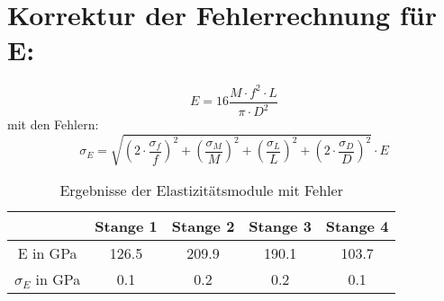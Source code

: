 \documentclass[12pt,a4paper]{article}
\author{Gruppe C14 \\ Julián Häck, Martin Koytek, Lars Wenning, Erik Zimmermann}
\begin{document}
\section{Korrektur der Fehlerrechnung für E:}
\begin{equation}
E=16 \frac{M\cdot f^2\cdot L}{\pi\cdot D^2}
\end{equation}
mit den Fehlern:
\begin{equation}
\sigma_{E}=\sqrt{(2\cdot\frac{\sigma_{f}}{f})^2+(\frac{\sigma_M}{M})^2+(\frac{\sigma_L}{L})^2+(2\cdot \frac{\sigma_D}{D})^2}\cdot E
\end{equation}

\begin{table}[H]\centering
\caption{Ergebnisse der Elastizitätsmodule mit Fehler}
\begin{tabular}{c|cccc}
 & Stange 1 & Stange 2 & Stange 3 & Stange 4 \\
\hline 
E in GPa & 126.5 & 209.9 & 190.1 & 103.7 \\ 
$\sigma_E$ in GPa & 0.1 & 0.2 & 0.2 & 0.1 \\ 
\end{tabular} 
\end{table}
\end{document}
